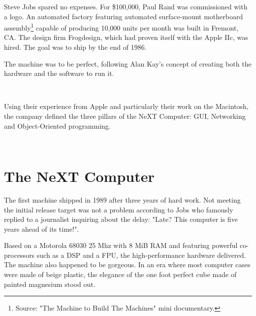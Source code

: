 \par
Steve Jobs spared no expenses. For \$100,000, Paul Rand was commissioned with a logo. An automated factory featuring automated surface-mount motherboard assembly\footnote{Source: "The Machine to Build The Machines" mini documentary.} capable of producing 10,000 units per month was built in Fremont, CA. The design firm Frogdesign, which had proven itself with the Apple IIc, was hired. The goal was to ship by the end of 1986.\\
\par
The machine was to be perfect, following Alan Kay's concept of creating both the hardware and the software to run it.\\
\par
{}\\
\par

Using their experience from Apple and particularly their work on the Macintosh, the company defined the three pillars of the NeXT Computer: GUI, Networking and Object-Oriented programming.\\
\par
{}\\






\par
\section{The NeXT Computer}
The first machine shipped in 1989 after three years of hard work. Not meeting the initial release target was not a problem according to Jobs who famously replied to a journalist inquiring about the delay: "Late? This computer is five years ahead of its time!".\\
\par
Based on a Motorola 68030 25 Mhz with 8 MiB RAM and featuring powerful co-processors such as a DSP and a FPU, the high-performance hardware delivered. The machine also happened to be gorgeous. In an era where most computer cases were made of beige plastic, the elegance of the one foot perfect cube made of painted magnesium stood out.\\
\par
{}


